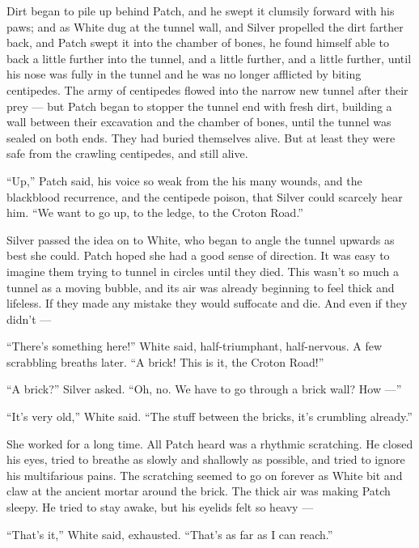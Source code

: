 \documentclass[ebook,oneside,openany,17pt]{memoir}
\newenvironment{tolerant}[1]{%
  \par\tolerance=#1\relax
}{%
  \par
}
\begin{document}
Dirt began to pile up behind Patch, and he swept it clumsily forward
with his paws; and as White dug at the tunnel wall, and Silver
propelled the dirt farther back, and Patch swept it into the chamber
of bones, he found himself able to back a little further into the
tunnel, and a little further, and a little further, until his nose was
fully in the tunnel and he was no longer afflicted by biting
centipedes. The army of centipedes flowed into the narrow new tunnel
after their prey — but Patch began to stopper the tunnel end with
fresh dirt, building a wall between their excavation and the chamber
of bones, until the tunnel was sealed on both ends. They had buried
themselves alive. But at least they were safe from the crawling
centipedes, and still alive.

“Up,” Patch said, his voice so weak from the his many wounds, and the
blackblood recurrence, and the centipede poison, that Silver could
scarcely hear him. “We want to go up, to the ledge, to the Croton
Road.”

Silver passed the idea on to White, who began to angle the tunnel
upwards as best she could. Patch hoped she had a good sense of
direction. It was easy to imagine them trying to tunnel in circles
until they died. This wasn’t so much a tunnel as a moving bubble, and
its air was already beginning to feel thick and lifeless. If they made
any mistake they would suffocate and die. And even if they didn’t —

\begin{tolerant}{1000}
“There’s something here!” White said, half-tri\-umph\-ant, half-nervous. A
few scrabbling breaths later. “A brick! This is it, the Croton Road!”
\end{tolerant}

“A brick?” Silver asked. “Oh, no. We have to go through a brick wall?
How —”

“It’s very old,” White said. “The stuff between the bricks, it’s
crumbling already.”

\begin{tolerant}{1000}
She worked for a long time. All Patch heard was a rhythmic
scratching. He closed his eyes, tried to breathe as slowly and
shallowly as possible, and tried to ignore his multifarious pains. The
scratching seem\-ed to go on forever as White bit and claw at the
ancient mortar around the brick. The thick air was making Patch
sleepy. He tried to stay awake, but his eyelids felt so heavy —
\end{tolerant}

“That’s it,” White said, exhausted. “That’s as far as I can reach.”
\end{document}
